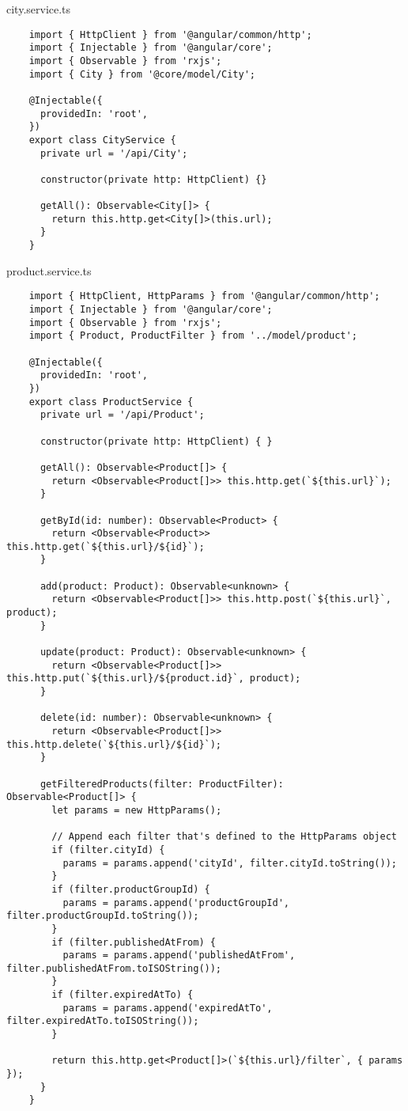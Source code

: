 city.service.ts
\lstset{style=ts}
\begin{lstlisting}
    import { HttpClient } from '@angular/common/http';
    import { Injectable } from '@angular/core';
    import { Observable } from 'rxjs';
    import { City } from '@core/model/City';
    
    @Injectable({
      providedIn: 'root',
    })
    export class CityService {
      private url = '/api/City';
    
      constructor(private http: HttpClient) {}
    
      getAll(): Observable<City[]> {
        return this.http.get<City[]>(this.url);
      }
    }
\end{lstlisting}

product.service.ts
\lstset{style=ts}
\begin{lstlisting}
    import { HttpClient, HttpParams } from '@angular/common/http';
    import { Injectable } from '@angular/core';
    import { Observable } from 'rxjs';
    import { Product, ProductFilter } from '../model/product';
    
    @Injectable({
      providedIn: 'root',
    })
    export class ProductService {
      private url = '/api/Product';
    
      constructor(private http: HttpClient) { }
    
      getAll(): Observable<Product[]> {
        return <Observable<Product[]>> this.http.get(`${this.url}`);
      }
    
      getById(id: number): Observable<Product> {
        return <Observable<Product>> this.http.get(`${this.url}/${id}`);
      }
    
      add(product: Product): Observable<unknown> {
        return <Observable<Product[]>> this.http.post(`${this.url}`, product);
      }
    
      update(product: Product): Observable<unknown> {
        return <Observable<Product[]>> this.http.put(`${this.url}/${product.id}`, product);
      }
    
      delete(id: number): Observable<unknown> {
        return <Observable<Product[]>> this.http.delete(`${this.url}/${id}`);
      }
    
      getFilteredProducts(filter: ProductFilter): Observable<Product[]> {
        let params = new HttpParams();
    
        // Append each filter that's defined to the HttpParams object
        if (filter.cityId) {
          params = params.append('cityId', filter.cityId.toString());
        }
        if (filter.productGroupId) {
          params = params.append('productGroupId', filter.productGroupId.toString());
        }
        if (filter.publishedAtFrom) {
          params = params.append('publishedAtFrom', filter.publishedAtFrom.toISOString());
        }
        if (filter.expiredAtTo) {
          params = params.append('expiredAtTo', filter.expiredAtTo.toISOString());
        }
    
        return this.http.get<Product[]>(`${this.url}/filter`, { params });
      }
    }
\end{lstlisting}

